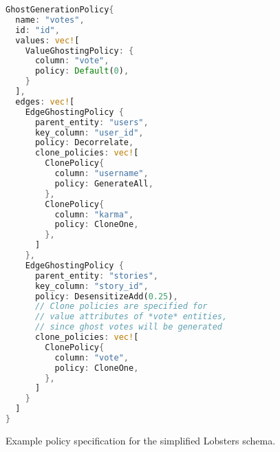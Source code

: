 \begin{figure}
\ContinuedFloat
\begin{lstlisting}[language=rust, numbers=none]
GhostGenerationPolicy{
  name: "votes",
  id: "id",
  values: vec![
    ValueGhostingPolicy: {
      column: "vote", 
      policy: Default(0),
    }
  ],
  edges: vec![
    EdgeGhostingPolicy {
      parent_entity: "users",
      key_column: "user_id",
      policy: Decorrelate,
      clone_policies: vec![
        ClonePolicy{
          column: "username",
          policy: GenerateAll,
        },
        ClonePolicy{
          column: "karma",
          policy: CloneOne,
        },
      ]
    },
    EdgeGhostingPolicy {
      parent_entity: "stories",
      key_column: "story_id",
      policy: DesensitizeAdd(0.25),
      // Clone policies are specified for 
      // value attributes of *vote* entities,
      // since ghost votes will be generated
      clone_policies: vec![
        ClonePolicy{
          column: "vote",
          policy: CloneOne,
        },
      ]
    }
  ]
}
\end{lstlisting}
\caption{Example policy specification for the simplified Lobsters schema.}
\label{fig:example}
\end{figure}

